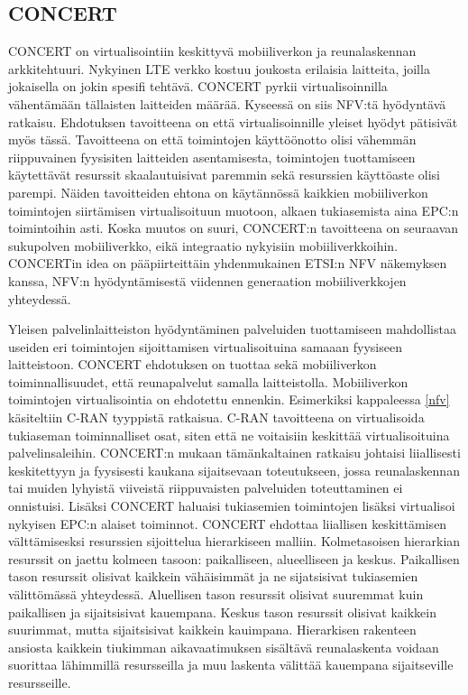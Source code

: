 \subsection{CONCERT}
CONCERT \cite{liu2014concert} on virtualisointiin keskittyvä mobiiliverkon ja reunalaskennan arkkitehtuuri.
Nykyinen LTE verkko kostuu joukosta erilaisia laitteita, joilla jokaisella on jokin spesifi tehtävä.
CONCERT pyrkii virtualisoinnilla vähentämään tällaisten laitteiden määrää.
Kyseessä on siis NFV:tä hyödyntävä ratkaisu.
Ehdotuksen tavoitteena on että virtualisoinnille yleiset hyödyt pätisivät myös tässä.
Tavoitteena on että toimintojen käyttöönotto olisi vähemmän riippuvainen fyysisiten laitteiden asentamisesta, toimintojen tuottamiseen käytettävät resurssit skaalautuisivat paremmin sekä resurssien käyttöaste olisi parempi.
Näiden tavoitteiden ehtona on käytännössä kaikkien mobiiliverkon toimintojen siirtämisen virtualisoituun muotoon, alkaen tukiasemista aina EPC:n toimintoihin asti.
Koska muutos on suuri, CONCERT:n tavoitteena on seuraavan sukupolven mobiiliverkko, eikä integraatio nykyisiin mobiiliverkkoihin.
CONCERTin idea on pääpiirteittäin yhdenmukainen ETSI:n NFV näkemyksen \cite{etsinfv5g} kanssa, NFV:n hyödyntämisestä viidennen generaation mobiiliverkkojen yhteydessä.

Yleisen palvelinlaitteiston hyödyntäminen palveluiden tuottamiseen mahdollistaa useiden eri toimintojen sijoittamisen virtualisoituina samaaan fyysiseen laitteistoon.
CONCERT ehdotuksen on tuottaa sekä mobiiliverkon toiminnallisuudet, että reunapalvelut samalla laitteistolla. 
Mobiiliverkon toimintojen virtualisointia on ehdotettu ennenkin. Esimerkiksi kappaleessa \ref{nfv} käsiteltiin C-RAN tyyppistä ratkaisua. C-RAN tavoitteena on virtualisoida tukiaseman toiminnalliset osat, siten että ne voitaisiin keskittää virtualisoituina palvelinsaleihin. 
CONCERT:n mukaan tämänkaltainen ratkaisu johtaisi liiallisesti keskitettyyn ja fyysisesti kaukana sijaitsevaan toteutukseen, jossa reunalaskennan tai muiden lyhyistä viiveistä riippuvaisten palveluiden toteuttaminen ei onnistuisi. Lisäksi CONCERT haluaisi tukiasemien toimintojen lisäksi virtualisoi nykyisen EPC:n alaiset toiminnot.
CONCERT ehdottaa liiallisen keskittämisen välttämisesksi resurssien sijoittelua hierarkiseen malliin.
Kolmetasoisen hierarkian resurssit on jaettu kolmeen tasoon: paikalliseen, alueelliseen ja keskus. 
Paikallisen tason resurssit olisivat kaikkein vähäisimmät ja ne sijatsisivat tukiasemien välittömässä yhteydessä.
Aluellisen tason resurssit olisivat suuremmat kuin paikallisen ja sijaitsisivat kauempana.
Keskus tason resurssit olisivat kaikkein suurimmat, mutta sijaitsisivat kaikkein kauimpana. 
Hierarkisen rakenteen ansiosta kaikkein tiukimman aikavaatimuksen sisältävä reunalaskenta voidaan suorittaa lähimmillä resursseilla ja muu laskenta välittää kauempana sijaitseville resursseille.

